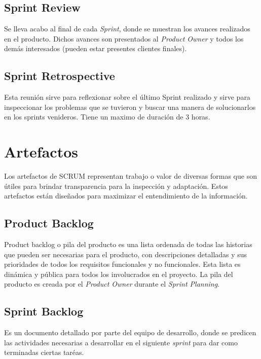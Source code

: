 \subsection{Sprint Review} \label{sect:Sprint Review}
Se lleva acabo al final de cada \textit{Sprint}, donde se muestran los avances realizados en el producto. Dichos avances son presentados al \textit{Product Owner} y todos los demás interesados (pueden estar presentes clientes finales). 

\subsection{Sprint Retrospective} \label{sect:Sprint Retrospective}
Esta reunión sirve para reflexionar sobre el último Sprint realizado y sirve para inspeccionar los problemas que se tuvieron y buscar una manera de solucionarlos en los sprints venideros. Tiene un maximo de duración de 3 horas.\cite{SCRUM}

\section{Artefactos} \label{sect:Artefactos}
Los artefactos de SCRUM representan trabajo o valor de diversas formas que son útiles para brindar transparencia para la inspección y adaptación. Estos artefactos están diseñados para maximizar el entendimiento de la información.\cite{SCRUM}

\subsection{Product Backlog} \label{sect:Product Backlog}
Product backlog o pila del producto es una lista ordenada de todas las historias que pueden ser necesarias para el producto, con descripciones detalladas y sus prioridades de todos los requisitos funcionales y no funcionales. Esta lista es dinámica y pública para todos los involucrados en el proyecto. La pila del producto es creada por el \textit{Product Owner} durante el \textit{Sprint Planning}. \cite{SCRUM}

\subsection{Sprint Backlog} \label{sect:Sprint Backlog}
Es un documento detallado por parte del equipo de desarrollo, donde
se predicen las actividades necesarias a desarrollar en el siguiente
\textit{sprint} para dar como terminadas ciertas taréas.\cite{SCRUM}